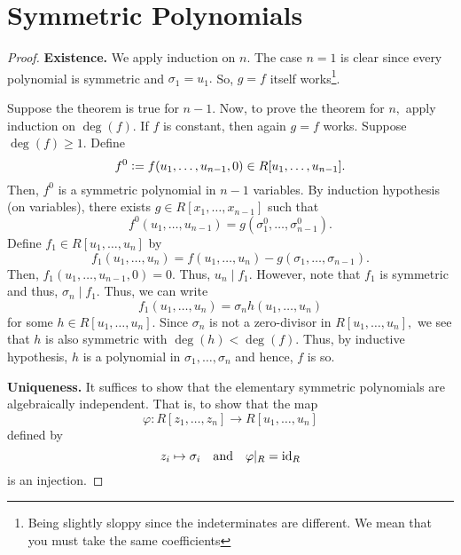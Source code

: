 \section{Symmetric Polynomials}
\FTSP*\label{thm:FTSP2}
\begin{flushright}\hyperref[thm:FTSP]{\upsym}\end{flushright}
\begin{proof}
    \textbf{Existence.} We apply induction on $n.$ The case $n = 1$ is clear since every polynomial is symmetric and $\sigma_1 = u_1.$ So, $g = f$ itself works\footnote{Being slightly sloppy since the indeterminates are different. We mean that you must take the same coefficients}.

    Suppose the theorem is true for $n - 1.$ Now, to prove the theorem for $n,$ apply induction on $\deg(f).$ If $f$ is constant, then again $g = f$ works. Suppose $\deg(f) \ge 1.$ Define
    \begin{equation*} 
        f^0 \vcentcolon= f(u_1, \ldots, u_{n - 1}, 0) \in R[u_1, \ldots, u_{n - 1}].
    \end{equation*}
    Then, $f^0$ is a symmetric polynomial in $n - 1$ variables. By induction hypothesis (on variables), there exists $g \in R[x_1, \ldots, x_{n - 1}]$ such that
    \begin{equation*} 
        f^0(u_1, \ldots, u_{n - 1}) = g(\sigma_1^0, \ldots, \sigma_{n - 1}^0).
    \end{equation*}
    Define $f_1 \in R[u_1, \ldots, u_n]$ by
    \begin{equation*} 
        f_1(u_1, \ldots, u_n) = f(u_1, \ldots, u_n) - g(\sigma_1, \ldots, \sigma_{n - 1}).
    \end{equation*}
    Then, $f_1(u_1, \ldots, u_{n - 1}, 0) = 0.$ Thus, $u_n \mid f_1.$ However, note that $f_1$ is symmetric and thus, $\sigma_n \mid f_1.$ Thus, we can write
    \begin{equation*} 
        f_1(u_1, \ldots, u_n) = \sigma_n h(u_1, \ldots, u_n)
    \end{equation*}
    for some $h \in R[u_1, \ldots, u_n].$ Since $\sigma_n$ is not a zero-divisor in $R[u_1, \ldots, u_n],$ we see that $h$ is also symmetric with $\deg(h) < \deg(f).$ Thus, by inductive hypothesis, $h$ is a polynomial in $\sigma_1, \ldots, \sigma_n$ and hence, $f$ is so.

    \textbf{Uniqueness.} It suffices to show that the elementary symmetric polynomials are algebraically independent. That is, to show that the map
    \begin{equation*} 
        \varphi : R[z_1, \ldots, z_n] \to R[u_1, \ldots, u_n]
    \end{equation*}
    defined by 
    \begin{equation*} 
        z_i \mapsto \sigma_i \quad\text{and}\quad \varphi|_R = \operatorname{id}_R
    \end{equation*}
    is an injection.


\end{proof}
